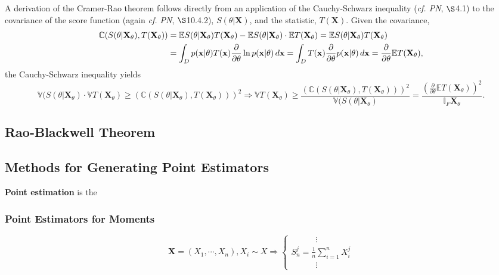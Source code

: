 \documentclass[12pt, twoside, draft]{article}
\begin{document}
A derivation of the Cramer-Rao theorem follows directly from an application of the Cauchy-Schwarz inequality (\textit{cf. PN}, $\S$4.1) to the covariance of the score function (again \textit{cf. PN}, $\S$10.4.2), $S(\theta | \mathbf{X})$, and the statistic, $T(\mathbf{X})$.  Given the covariance,
\begin{align}
\mathbb{C}(S(\theta | \mathbf{X}_\theta), T(\mathbf{X}_\theta)) &= \mathbb{E} S(\theta | \mathbf{X}_\theta) T(\mathbf{X}_\theta) - \mathbb{E}S(\theta | \mathbf{X}_\theta) \cdot \mathbb{E} T(\mathbf{X}_\theta) =  \mathbb{E} S(\theta | \mathbf{X}_\theta) T(\mathbf{X}_\theta) \notag \\
&= \int_D p(\mathbf{x} | \theta) T(\mathbf{x}) \frac{\partial}{\partial \theta} \ln p (\mathbf{x} | \theta) \, d\mathbf{x} = \int_D T(\mathbf{x}) \frac{\partial}{\partial \theta} p(\mathbf{x} | \theta) \, d\mathbf{x} = \frac{\partial}{\partial \theta} \mathbb{E} T(\mathbf{X}_\theta),
\end{align}
the Cauchy-Schwarz inequality yields
\begin{equation}
\mathbb{V}(S(\theta | \mathbf{X}_\theta) \cdot \mathbb{V} T(\mathbf{X}_\theta) \geq\left(\mathbb{C}(S(\theta | \mathbf{X}_\theta), T(\mathbf{X}_\theta)) \right)^2 \Rightarrow \mathbb{V} T(\mathbf{X}_\theta) \geq \frac{\left( \mathbb{C}(S(\theta | \mathbf{X}_\theta), T(\mathbf{X}_\theta)) \right)^2}{\mathbb{V}(S(\theta | \mathbf{X}_\theta)} = \frac{\left( \frac{\partial}{\partial \theta} \mathbb{E} T(\mathbf{X}_\theta) \right)^2}{\mathbb{I}_F \mathbf{X}_\theta}.
\end{equation}

\subsection{Rao-Blackwell Theorem}\label{sec:Rao-Blackwell_theorem}

\subsection{Methods for Generating Point Estimators}\label{sec:point_estimators}
\textbf{Point estimation} is the 
\subsubsection{Point Estimators for Moments}\label{sec:point_estimators_moments}

\begin{equation}
\mathbf{X} = (X_1, \cdots, X_n), X_i \sim X \Rightarrow
\begin{cases}
\hspace{35pt} \vdots \\
S^j_n = \frac{1}{n} \sum_{i=1}^n X^j_i \\
\hspace{35pt} \vdots
\end{cases}
\end{equation}
\end{document}
